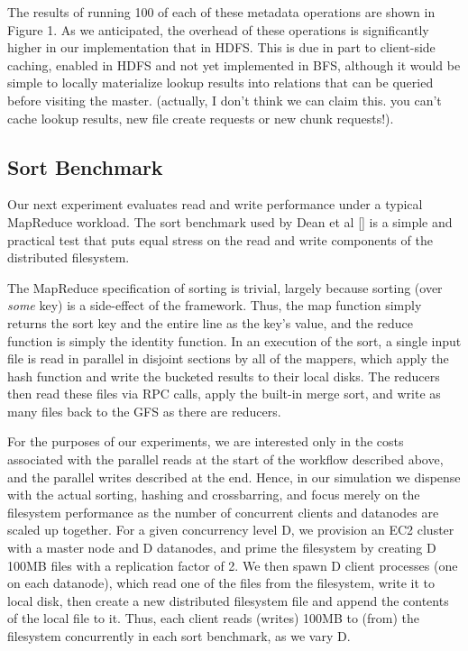 \documentclass{article}
\begin{document}
The results of running 100 of each of these metadata operations are shown in Figure 1.  As we anticipated, the overhead of these operations is significantly higher in our implementation that in HDFS.  This is due in part to client-side caching, enabled in HDFS and not yet implemented in BFS, although it would be simple to locally materialize lookup results into relations that can be queried before visiting the master. (actually, I don't think we can claim this.  you can't cache lookup results, new file create requests or new chunk requests!).

\subsection{Sort Benchmark}
Our next experiment evaluates read and write performance under a typical MapReduce workload.  The sort benchmark used by Dean et al [] is a simple and practical test that puts equal stress on the read and write components of the distributed filesystem.  

The MapReduce specification of sorting is trivial, largely because sorting (over \emph{some} key) is a side-effect of the framework.  Thus, the map function simply returns the sort key and the entire line as the key's value, and the reduce function is simply the identity function.  In an execution of the sort, a single input file is read in parallel in disjoint sections by all of the mappers, which apply the hash function and write the bucketed results to their local disks.  The reducers then read these files via RPC calls, apply the built-in merge sort, and write as many files back to the GFS as there are reducers.

For the purposes of our experiments, we are interested only in the costs associated with the parallel reads at the start of the workflow described above, and the parallel writes described at the end.  Hence, in our simulation we dispense with the actual sorting, hashing and crossbarring, and focus merely on the filesystem performance as  the number of concurrent clients and datanodes are scaled up together.  For a given concurrency level D, we provision an EC2 cluster with a master node and D datanodes, and prime the filesystem by creating D 100MB files with a replication factor of 2.  We then spawn D client processes (one on each datanode), which read one of the files from the filesystem, write it to local disk, then create a new distributed filesystem file and append the contents of the local file to it.  Thus, each client reads (writes) 100MB to (from) the filesystem concurrently in each sort benchmark, as we vary D.
\end{document}
